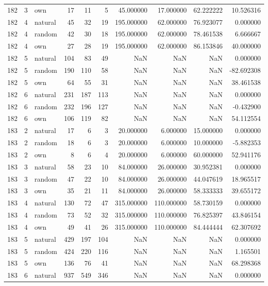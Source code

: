\begin{table}[htbp]
\begin{tabular}{rrlrrrrrrr}
182 & 3 & own & 17 & 11 & 5 & 45.000000 & 17.000000 & 62.222222 & 10.526316 \\
182 & 4 & natural & 45 & 32 & 19 & 195.000000 & 62.000000 & 76.923077 & 0.000000 \\
182 & 4 & random & 42 & 30 & 18 & 195.000000 & 62.000000 & 78.461538 & 6.666667 \\
182 & 4 & own & 27 & 28 & 19 & 195.000000 & 62.000000 & 86.153846 & 40.000000 \\
182 & 5 & natural & 104 & 83 & 49 & NaN & NaN & NaN & 0.000000 \\
182 & 5 & random & 190 & 110 & 58 & NaN & NaN & NaN & -82.692308 \\
182 & 5 & own & 64 & 55 & 31 & NaN & NaN & NaN & 38.461538 \\
182 & 6 & natural & 231 & 187 & 113 & NaN & NaN & NaN & 0.000000 \\
182 & 6 & random & 232 & 196 & 127 & NaN & NaN & NaN & -0.432900 \\
182 & 6 & own & 106 & 119 & 82 & NaN & NaN & NaN & 54.112554 \\
183 & 2 & natural & 17 & 6 & 3 & 20.000000 & 6.000000 & 15.000000 & 0.000000 \\
183 & 2 & random & 18 & 6 & 3 & 20.000000 & 6.000000 & 10.000000 & -5.882353 \\
183 & 2 & own & 8 & 6 & 4 & 20.000000 & 6.000000 & 60.000000 & 52.941176 \\
183 & 3 & natural & 58 & 23 & 10 & 84.000000 & 26.000000 & 30.952381 & 0.000000 \\
183 & 3 & random & 47 & 22 & 10 & 84.000000 & 26.000000 & 44.047619 & 18.965517 \\
183 & 3 & own & 35 & 21 & 11 & 84.000000 & 26.000000 & 58.333333 & 39.655172 \\
183 & 4 & natural & 130 & 72 & 47 & 315.000000 & 110.000000 & 58.730159 & 0.000000 \\
183 & 4 & random & 73 & 52 & 32 & 315.000000 & 110.000000 & 76.825397 & 43.846154 \\
183 & 4 & own & 49 & 41 & 26 & 315.000000 & 110.000000 & 84.444444 & 62.307692 \\
183 & 5 & natural & 429 & 197 & 104 & NaN & NaN & NaN & 0.000000 \\
183 & 5 & random & 424 & 220 & 116 & NaN & NaN & NaN & 1.165501 \\
183 & 5 & own & 136 & 76 & 41 & NaN & NaN & NaN & 68.298368 \\
183 & 6 & natural & 937 & 549 & 346 & NaN & NaN & NaN & 0.000000 \\

\end{tabular}
\end{table}
